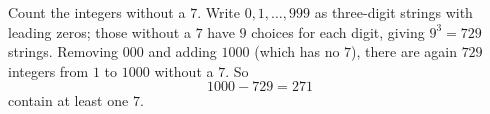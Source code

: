 Count the integers without a $7$. Write $0,1,\dots,999$ as three-digit strings with leading zeros; those without a $7$ have $9$ choices for each digit, giving $9^3=729$ strings. Removing $000$ and adding $1000$ (which has no $7$), there are again $729$ integers from $1$ to $1000$ without a $7$. So
\[1000-729=\boxed{271}\]
contain at least one $7$.
